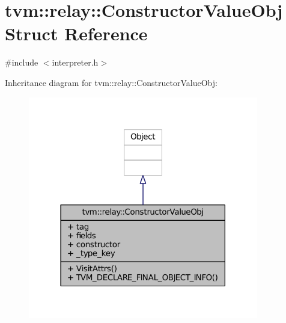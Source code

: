 \hypertarget{structtvm_1_1relay_1_1ConstructorValueObj}{}\section{tvm\+:\+:relay\+:\+:Constructor\+Value\+Obj Struct Reference}
\label{structtvm_1_1relay_1_1ConstructorValueObj}


{\ttfamily \#include $<$interpreter.\+h$>$}



Inheritance diagram for tvm\+:\+:relay\+:\+:Constructor\+Value\+Obj\+:
\nopagebreak
\begin{figure}[H]
\begin{center}
\leavevmode
\includegraphics[width=285pt]{structtvm_1_1relay_1_1ConstructorValueObj__inherit__graph}
\end{center}
\end{figure}



